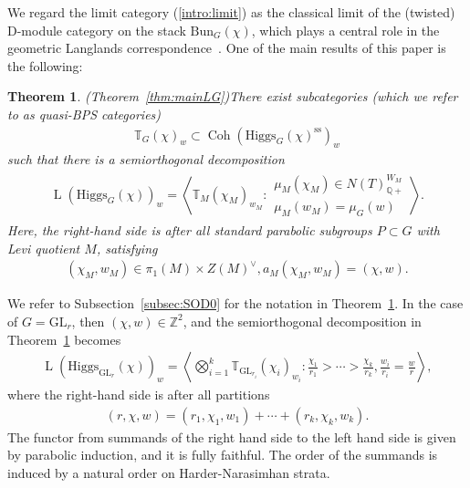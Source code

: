 \documentclass [11pt,oneside,a4paper,mathscr]{amsart}
\newtheorem{thm}{Theorem}[section]
\theoremstyle{definition}
\newcommand{\LL}{\operatorname{L}}
\newcommand{\Coh}{\operatorname{Coh}}
\newcommand{\Hig}{\mathrm{Higgs}}
\newcommand{\Bun}{\mathrm{Bun}}
\begin{document}
We regard the limit category (\ref{intro:limit}) as the classical limit of the (twisted) D-module category on the stack $\Bun_G(\chi)$, which plays a central role in the geometric Langlands correspondence~\cite{BD0, AG}.
One of the main results of this paper is the following:
\begin{thm}\emph{(Theorem~\ref{thm:mainLG})}\label{conj:intro}
There exist subcategories (which we refer to as quasi-BPS categories)
\begin{align}\label{intro:qbps0}
    \mathbb{T}_G(\chi)_w \subset \Coh(\Hig_G(\chi)^{\mathrm{ss}})_w
\end{align}
such that there is a semiorthogonal decomposition 
\begin{align}\label{intro:sod:L}
    \LL(\Hig_G(\chi))_w=\left\langle \mathbb{T}_{M}(\chi_{M})_{w_{M}} : \begin{array}{ll}
     \mu_M(\chi_{M})\in N(T)_{\mathbb{Q}+}^{W_M} \\ \mu_M(w_M)=\mu_G(w) \end{array}\right\rangle.
\end{align}
    Here, the right-hand side is after all standard parabolic subgroups $P\subset G$ with Levi 
    quotient $M$, 
    satisfying
    \begin{align}\label{intro:chiw}
    (\chi_{M}, w_{M}) \in \pi_1(M) \times Z(M)^{\vee}, \mathbb{}a_{M}(\chi_{M}, w_{M})=(\chi, w).
    \end{align}
\end{thm}
We refer to Subsection~\ref{subsec:SOD0} for the notation in Theorem~\ref{conj:intro}. 
In the case of $G=\mathrm{GL}_r$, then $(\chi, w)\in \mathbb{Z}^2$, and 
the semiorthogonal decomposition 
in Theorem~\ref{conj:intro} becomes 
\begin{align}\label{sod:intro1}
   \LL(\Hig_{\mathrm{GL}_r}(\chi))_w=\left\langle \bigotimes_{i=1}^k \mathbb{T}_{\mathrm{GL}_{r_i}}(\chi_i)_{w_i} : \frac{\chi_1}{r_1}>\cdots>\frac{\chi_k}{r_k}, \frac{w_i}{r_i}=\frac{w}{r}  \right\rangle,  
\end{align}
where the right-hand side is after all partitions 
\begin{align}\label{intro:part}
    (r, \chi, w)=(r_1, \chi_1, w_1)+\cdots+(r_k, \chi_k, w_k).
\end{align}
The functor from summands of the right hand side to the left hand side is given by parabolic induction, and it is fully faithful. The order of the summands is induced by a natural order on Harder-Narasimhan strata. 
\end{document}
